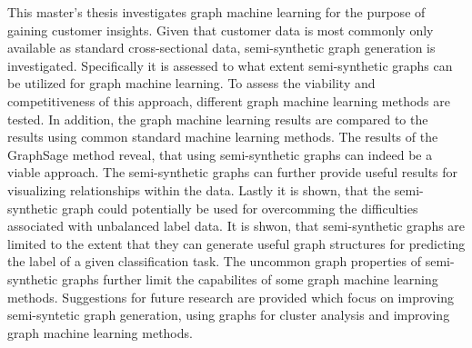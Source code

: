 
  \onehalfspacing

  This master's thesis investigates graph machine learning for the purpose of
  gaining customer insights. Given that customer data is most commonly only
  available as standard cross-sectional data, semi-synthetic graph generation is
  investigated. Specifically it is assessed to what extent semi-synthetic graphs
  can be utilized for graph machine learning. To assess the viability and
  competitiveness of this approach, different graph machine learning methods
  are tested. In addition, the graph machine learning results are compared to
  the results using common standard machine learning methods. The results of
  the GraphSage method reveal, that using semi-synthetic graphs can indeed be a
  viable approach. The semi-synthetic graphs can further provide useful results
  for visualizing relationships within the data. Lastly it is shown, that the
  semi-synthetic graph could potentially be used for overcomming the
  difficulties associated with unbalanced label data. It is shwon, that 
  semi-synthetic graphs are limited to the extent that they can generate useful 
  graph structures for predicting the label of a given classification task. The
  uncommon graph properties of semi-synthetic graphs further limit the
  capabilites of some graph machine learning methods. Suggestions for future 
  research are provided which focus on improving semi-syntetic graph generation, 
  using graphs for cluster analysis and improving graph machine learning methods.
